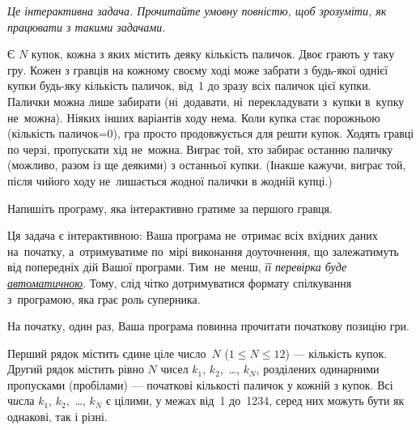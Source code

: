 ﻿{\it Це інтерактивна задача. Прочитайте умовну повністю, щоб зрозуміти, як працювати з такими задачами.}

Є $N$ купок, кожна з яких містить деяку кількість паличок.
Двоє грають у таку гру.
Кожен з гравців на кожному своєму ході може забрати з будь-якої однієї купки будь-яку кількість паличок, від~1 до зразу всіх паличок цієї купки. Палички можна лише забирати (ні~додавати, ні~перекладувати з~купки в~купку не~можна).
Ніяких інших варіантів ходу нема. 
Коли купка стає порожньою (кількість паличок=0), гра просто продовжується для решти купок.
Ходять гравці по черзі, пропускати хід не~можна.
Виграє той, хто забирає останню паличку (можливо, разом із ще деякими) з останньої купки.
(Інакше кажучи, виграє той, після чийого ходу не~лишається жодної палички в жодній купці.)

Напишіть програму, яка інтерактивно гратиме за першого гравця. 

Ця задача є інтерактивною: 
Ваша програма не~отримає всіх вхідних даних на~початку,
а~отримуватиме по~мірі виконання доуточнення, 
що залежатимуть від попередніх дій Вашої програми. 
Тим~не~менш, {\it її перевірка буде
\underline{автоматичною}}. 
Тому, слід чітко дотримуватися формату спілкування з~програмою, яка грає роль суперника.



\Interaction

На початку, один раз, Ваша програма повинна прочитати початкову позицію гри.

Перший рядок містить єдине ціле число~$N$ ($1\leqslant N\leqslant 12$) --- кількість купок.
Др{\it у}гий рядок містить рівно $N$ чисел $k_1$, $k_2$,~\dots, $k_N$, розділених одинарними пропусками (пробілами) --- початкові кількості паличок у кожній з купок. Всі ч{\it и}сла $k_1$, $k_2$,~\dots, $k_N$ є цілими, у межах від~1 до~1234, серед них можуть бути як однакові, так і різні.

